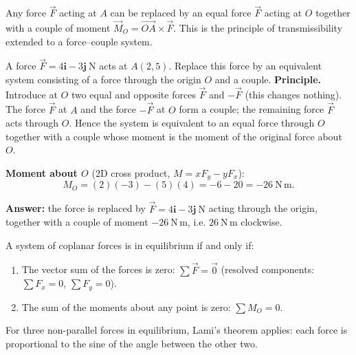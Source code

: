 \documentclass[11pt]{article}
\newcommand{\cle}[1]{{\popxbold\color{popdark}#1}}
\begin{document}
\begin{propriete}
Any force $\vec{F}$ acting at $A$ can be replaced by an equal force $\vec{F}$ acting at $O$ together with a couple of moment $\vec{M}_O = \overrightarrow{OA} \times \vec{F}$. This is the \cle{principle of transmissibility} extended to a force–couple system.
\end{propriete}

\begin{exoresolu}
A force $\vec{F} = 4\mathbf{i} - 3\mathbf{j}\ \mathrm{N}$ acts at $A(2,5)$. Replace this force by an equivalent system consisting of a force through the origin $O$ and a couple.
\tcblower
\textbf{Principle.} Introduce at $O$ two equal and opposite forces $\vec{F}$ and $-\vec{F}$ (this changes nothing). The force $\vec{F}$ at $A$ and the force $-\vec{F}$ at $O$ form a couple; the remaining force $\vec{F}$ acts through $O$. Hence the system is equivalent to an equal force through $O$ together with a couple whose moment is the moment of the original force about $O$.

\textbf{Moment about $O$} (2D cross product, $M = xF_y - yF_x$):
\[
M_O = (2)(-3) - (5)(4) = -6 - 20 = -26\ \mathrm{N\,m}.
\]

\textbf{Answer:} the force is replaced by $\vec{F} = 4\mathbf{i} - 3\mathbf{j}\ \mathrm{N}$ acting through the origin, together with a couple of moment $-26\ \mathrm{N\,m}$, i.e. $26\ \mathrm{N\,m}$ clockwise.
\end{exoresolu}

\begin{propriete}
A system of coplanar forces is in equilibrium if and only if:
\begin{enumerate}
\item The vector sum of the forces is zero: $\sum \vec{F} = \vec{0}$ (resolved components: $\sum F_x = 0$, $\sum F_y = 0$).
\item The sum of the moments about any point is zero: $\sum M_O = 0$.
\end{enumerate}
For three non-parallel forces in equilibrium, \cle{Lami's theorem} applies: each force is proportional to the sine of the angle between the other two.
\end{propriete}
\end{document}
